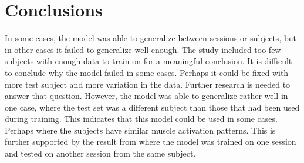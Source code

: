 \documentclass[../main.tex]{subfiles}
\begin{document}
\chapter{Conclusions}
In some cases, the model was able to generalize between sessions or subjects, but in other cases it failed to generalize well enough.
The study included too few subjects with enough data to train on for a meaningful conclusion.
It is difficult to conclude why the model failed in some cases. 
Perhaps it could be fixed with more test subject and more variation in the data.
Further research is needed to answer that question.
However, the model was able to generalize rather well in one case, where the test set was a different subject than those that had been used during training.
This indicates that this model could be used in some cases.
Perhaps where the subjects have similar muscle activation patterns.
This is further supported by the result from where the model was trained on one session and tested on another session from the same subject.
\end{document}
